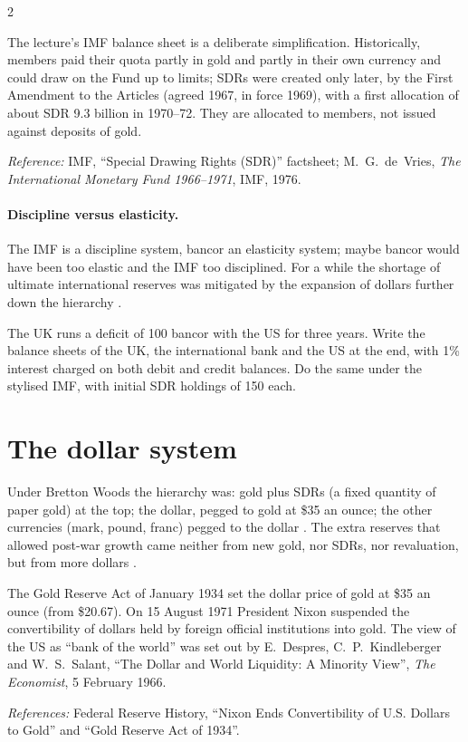 \begin{paracol}{2}
\begin{coursenote}
The lecture's IMF balance sheet is a deliberate simplification. Historically, members paid their quota partly in gold and partly in their own currency and
could draw on the Fund up to limits; SDRs were created only later, by the First Amendment to the Articles (agreed 1967, in force 1969), with a first allocation
of about SDR 9.3 billion in 1970--72. They are allocated to members, not issued against deposits of gold.\par
\emph{Reference:} IMF, ``Special Drawing Rights (SDR)'' factsheet; M.~G.~de~Vries, \emph{The International Monetary Fund 1966--1971}, IMF, 1976.
\end{coursenote}

\paragraph{Discipline versus elasticity.} The IMF is a discipline system, bancor an elasticity system; maybe bancor would have been too elastic and the IMF too
disciplined. For a while the shortage of ultimate international reserves was mitigated by the expansion of dollars further down the hierarchy
.

\begin{exercise}
The UK runs a deficit of 100 bancor with the US for three years. Write the balance sheets of the UK, the international bank and the US at the end, with
1\% interest charged on both debit and credit balances. Do the same under the stylised IMF, with initial SDR holdings of 150 each.
\end{exercise}


\section{The dollar system}\label{sec:intl-dollar}

Under Bretton Woods the hierarchy was: gold plus SDRs (a fixed quantity of paper gold) at the top; the dollar, pegged to gold at \$35 an ounce; the other
currencies (mark, pound, franc) pegged to the dollar . The extra reserves that allowed post-war growth came
neither from new gold, nor SDRs, nor revaluation, but from more dollars .

\begin{history}
The Gold Reserve Act of January 1934 set the dollar price of gold at \$35 an ounce (from \$20.67). On 15 August 1971 President Nixon suspended the
convertibility of dollars held by foreign official institutions into gold. The view of the US as ``bank of the world'' was set out by E.~Despres,
C.~P.~Kindleberger and W.~S.~Salant, ``The Dollar and World Liquidity: A Minority View'', \emph{The Economist}, 5 February 1966.\par
\emph{References:} Federal Reserve History, ``Nixon Ends Convertibility of U.S. Dollars to Gold'' and ``Gold Reserve Act of 1934''.
\end{history}


\end{paracol}
